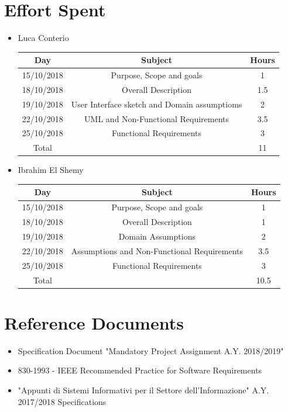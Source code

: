 \documentclass[12pt,a4paper]{article}
\begin{document}
	\section{Effort Spent}
		\begin{itemize}
			\item Luca Conterio
			\begin{center}
				\begin{tabular}{| c | c | c |}
					\hline
					Day & Subject & Hours \\ \hline
					15/10/2018 & Purpose, Scope and goals & 1 \\
					18/10/2018 & Overall Description & 1.5 \\
                    19/10/2018  & User Interface sketch and Domain assumptioms & 2 \\
                    22/10/2018  & UML and Non-Functional Requirements & 3.5 \\
                    25/10/2018 & Functional Requirements & 3 \\
					\hline
					Total & & 11\\
					\hline
				\end{tabular}
			\end{center}
		
			\item Ibrahim El Shemy
			\begin{center}
				\begin{tabular}{| c | c | c |}
					\hline
					Day & Subject & Hours \\ \hline
					15/10/2018 & Purpose, Scope and goals & 1 \\
					18/10/2018 & Overall Description & 1 \\
         			19/10/2018  & Domain Assumptions & 2 \\
                    22/10/2018  & Assumptions and Non-Functional Requirements & 3.5 \\
                    25/10/2018 & Functional Requirements & 3 \\
					\hline
					Total & & 10.5\\
					\hline
				\end{tabular}
			\end{center}
		\end{itemize}
	\section{Reference Documents}
	\begin{itemize}
		\item Specification Document "Mandatory Project Assignment A.Y. 2018/2019"
		\item 830-1993 - IEEE Recommended Practice for Software Requirements
		\item "Appunti di Sistemi Informativi per il Settore dell'Informazione" A.Y. 2017/2018
		 Specifications
	\end{itemize}
	
\end{document}
